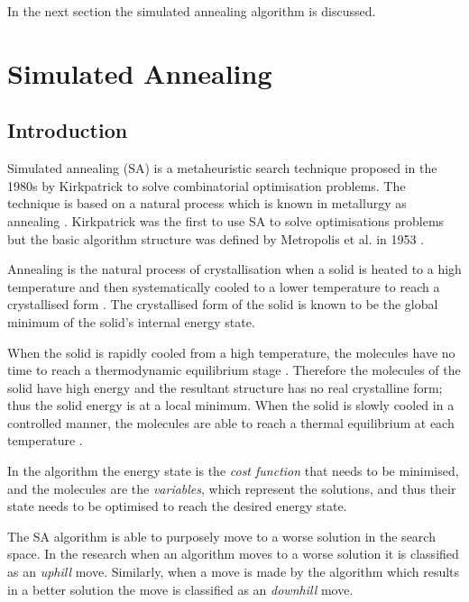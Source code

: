 In the next section the simulated annealing algorithm is discussed.
\section{Simulated Annealing}
\label{sec:simulatedannealing}

\subsection{Introduction}
\label{sec:SAIntroduction}
Simulated annealing (SA) is a metaheuristic search technique proposed in the 1980s by Kirkpatrick to solve combinatorial optimisation problems. The technique is based on a natural process which is known in metallurgy as annealing \cite{CurveFittingSA,SASingleMultiObj,TempCyclingSA,ChaosSA}. Kirkpatrick was the first to use SA to solve optimisations problems but the basic algorithm structure was defined by Metropolis et al. in 1953 \cite{CurveFittingSA,VeryFastSAImageEnchancement}.

Annealing is the natural process of crystallisation when a solid is heated to a high temperature and then systematically cooled to a lower temperature to reach a crystallised form \cite{CurveFittingSA,NewSAs,MobileRobotSA,ConstantTempSA}. The crystallised form of the solid is known to be the global minimum of the solid's internal energy state. 

When the solid is rapidly cooled from a high temperature, the molecules have no time to reach a thermodynamic equilibrium stage \cite{MobileRobotSA,ConstantTempSA}. Therefore the molecules of the solid have high energy and the resultant structure has no real crystalline form; thus the solid energy is at a local minimum\cite{CurveFittingSA,NewSAs,MobileRobotSA}. When the solid is slowly cooled in a controlled manner, the molecules are able to reach a thermal equilibrium at each temperature \cite{ChaosSA,CurveFittingSA,NewSAs}.

In the algorithm the energy state is the \emph{cost function} that needs to be minimised, and the molecules are the \emph{variables}, which represent the solutions, and thus their state needs to be optimised to reach the desired energy state.

The SA algorithm is able to purposely move to a worse solution in the search space\cite{EcoEquilSA}. In the research when an algorithm moves to a worse solution it is classified as an \emph{uphill} move\cite{AIModernApproach}. Similarly, when a move is made by the algorithm which results in a better solution the move is classified as an \emph{downhill} move\cite{AIModernApproach}.

